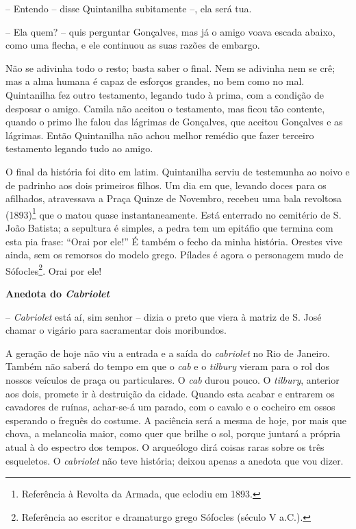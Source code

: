 -- Entendo -- disse Quintanilha subitamente --, ela será tua.

-- Ela quem? -- quis perguntar Gonçalves, mas já o amigo voava escada
abaixo, como uma flecha, e ele continuou as suas razões de embargo.

Não se adivinha todo o resto; basta saber o final. Nem se adivinha nem
se crê; mas a alma humana é capaz de esforços grandes, no bem como no
mal. Quintanilha fez outro testamento, legando tudo à prima, com a
condição de desposar o amigo. Camila não aceitou o testamento, mas ficou
tão contente, quando o primo lhe falou das lágrimas de Gonçalves, que
aceitou Gonçalves e as lágrimas. Então Quintanilha não achou melhor
remédio que fazer terceiro testamento legando tudo ao amigo.

O final da história foi dito em latim. Quintanilha serviu de testemunha
ao noivo e de padrinho aos dois primeiros filhos. Um dia em que, levando
doces para os afilhados, atravessava a Praça Quinze de Novembro, recebeu
uma bala revoltosa (1893)\footnote{Referência à Revolta da Armada, que
  eclodiu em 1893.} que o matou quase instantaneamente. Está enterrado
no cemitério de S. João Batista; a sepultura é simples, a pedra tem um
epitáfio que termina com esta pia frase: ``Orai por ele!'' É também o
fecho da minha história. Orestes vive ainda, sem os remorsos do modelo
grego. Pílades é agora o personagem mudo de Sófocles\footnote{Referência
  ao escritor e dramaturgo grego Sófocles (século V a.C.).}. Orai por
ele!

\textbf{Anedota do \emph{Cabriolet}}

-- \emph{Cabriolet} está aí, sim senhor -- dizia o preto que viera à
matriz de S. José chamar o vigário para sacramentar dois moribundos.

A geração de hoje não viu a entrada e a saída do \emph{cabriolet} no Rio
de Janeiro. Também não saberá do tempo em que o \emph{cab} e o
\emph{tilbury} vieram para o rol dos nossos veículos de praça ou
particulares. O \emph{cab} durou pouco. O \emph{tilbury}, anterior aos
dois, promete ir à destruição da cidade. Quando esta acabar e entrarem
os cavadores de ruínas, achar-se-á um parado, com o cavalo e o cocheiro
em ossos esperando o freguês do costume. A paciência será a mesma de
hoje, por mais que chova, a melancolia maior, como quer que brilhe o
sol, porque juntará a própria atual à do espectro dos tempos. O
arqueólogo dirá coisas raras sobre os três esqueletos. O
\emph{cabriolet} não teve história; deixou apenas a anedota que vou
dizer.

